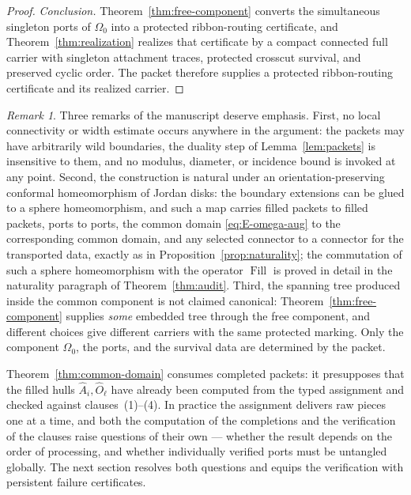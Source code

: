 \documentclass[11pt,reqno]{amsart}
\theoremstyle{definition}
\theoremstyle{remark}
\newtheorem{remark}[theorem]{Remark}
\newcommand{\Fill}{\operatorname{Fill}}
\begin{document}
\begin{proof}
\emph{Conclusion.}
Theorem~\ref{thm:free-component} converts the simultaneous singleton ports of
$\Omega_0$ into a protected ribbon-routing certificate, and
Theorem~\ref{thm:realization} realizes that certificate by a compact connected full
carrier with singleton attachment traces, protected crosscut survival, and preserved
cyclic order.  The packet therefore supplies a protected ribbon-routing
certificate and its realized carrier.
\end{proof}

\begin{remark}\label{rem:E-common-domain}
Three remarks of the manuscript \cite{MWman} deserve emphasis. First, no local
connectivity or width estimate occurs anywhere in the argument: the packets may have
arbitrarily wild boundaries, the duality step of Lemma~\ref{lem:packets} is
insensitive to them, and no modulus, diameter, or incidence bound is invoked at any
point. Second, the construction is natural under an orientation-preserving conformal
homeomorphism of Jordan disks: the boundary extensions can be glued to a sphere
homeomorphism, and such a map carries filled packets to filled packets, ports to
ports, the common domain \eqref{eq:E-omega-aug} to the corresponding common domain,
and any selected connector to a connector for the transported data, exactly as in
Proposition~\ref{prop:naturality}; the commutation of such a sphere homeomorphism
with the operator $\Fill$ is proved in detail in the naturality paragraph of
Theorem~\ref{thm:audit}. Third, the spanning tree produced inside the common
component is not claimed canonical: Theorem~\ref{thm:free-component} supplies
\emph{some} embedded tree through the free component, and different choices give
different carriers with the same protected marking. Only the component $\Omega_0$,
the ports, and the survival data are determined by the packet.
\end{remark}

Theorem~\ref{thm:common-domain} consumes completed packets: it presupposes that the
filled hulls $\widehat A_i,\widehat O_\ell$ have already been computed from the typed
assignment and checked against clauses~(1)--(4). In practice the assignment delivers
raw pieces one at a time, and both the computation of the completions and the
verification of the clauses raise questions of their own --- whether the result
depends on the order of processing, and whether individually verified ports must be
untangled globally. The next section resolves both questions and equips the
verification with persistent failure certificates.
\end{document}
